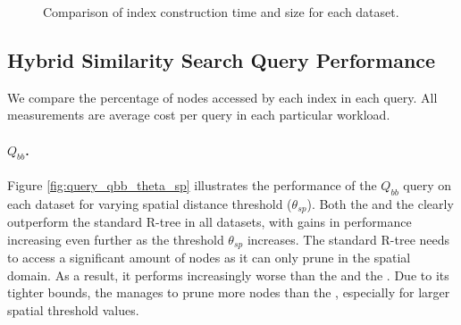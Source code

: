 \begin{figure}[!tb]
 \centering
 \caption{Comparison of index construction time and size for each dataset.}
 \label{fig:index_construction}
\end{figure}

\subsection{Hybrid Similarity Search Query Performance}

We compare the percentage of nodes accessed by each index in each query. All measurements are average cost per query in each particular workload.

\paragraph{$Q_{bb}$.} Figure \ref{fig:query_qbb_theta_sp} illustrates the performance of the $Q_{bb}$ query on each dataset for varying spatial distance threshold ($\theta_{sp}$). Both the \tsr and the \btsr clearly outperform the standard R-tree in all datasets, with gains in performance increasing even further as the threshold $\theta_{sp}$ increases. The standard R-tree needs to access a significant amount of nodes as it can only prune in the spatial domain. As a result, it performs increasingly worse than the \tsr and the \btsr. Due to its tighter bounds, the \btsr manages to prune more nodes than the \tsr, especially for larger spatial threshold values.

